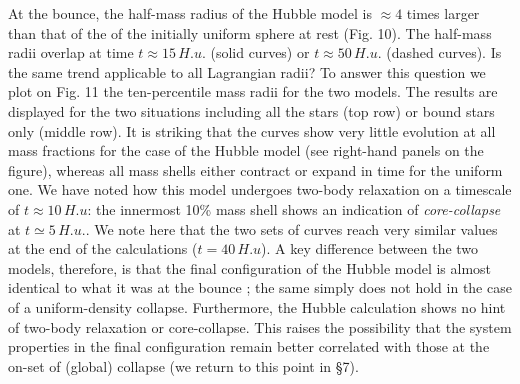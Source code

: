 At the bounce, the half-mass radius of the Hubble model is $\approx 4$ times larger than that of the of the initially uniform sphere at rest (Fig. 10). The half-mass radii overlap at time $t \approx 15 \,H.u.$ (solid curves) or $t \approx 50 \,H.u.$ (dashed curves). Is the same trend applicable to all Lagrangian radii? To answer this question we plot on Fig. 11 the ten-percentile mass radii for the two models. The results are displayed for the two situations including all the stars (top row) or bound stars only (middle row). It is striking that the curves show very little evolution at all mass fractions for the case of the Hubble model (see right-hand panels on the figure), whereas all mass shells either contract or expand in time for the uniform one. We have noted how this model undergoes two-body relaxation on a timescale of $t \approx 10 \,H.u$: the innermost 10\% mass shell shows an  indication of \textit{core-collapse} at $t \simeq 5 \,H.u.$. We note here that the two sets of curves reach very similar values at the end of the calculations ($t = 40\, H.u$). A key difference between the two models, therefore, is that the final configuration of the Hubble model is almost identical to what it was at the bounce ; the same simply does not hold in the case of a uniform-density collapse. Furthermore, the Hubble calculation shows no hint of two-body relaxation or core-collapse. This raises the possibility that the system properties in the final configuration remain better correlated with those at the on-set of (global) collapse (we return to this point in \S7).

